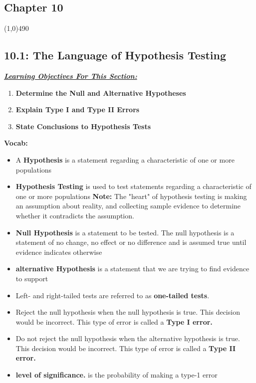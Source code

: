 \documentclass{report}
\begin{document}
    \pagebreak 
    \begin{center}
        \section*{Chapter 10}
    \end{center}
    \line(1,0){490}
    \bigbreak \noindent 
    \subsection*{10.1: The Language of Hypothesis Testing}
    \bigbreak \noindent 
    \textbf{\textit{\underline{Learning Objectives For This Section:}}}
    \begin{enumerate}
        \item \textbf{Determine the Null and Alternative Hypotheses}
        \item \textbf{Explain Type I and Type II Errors}
        \item \textbf{State Conclusions to Hypothesis Tests}
    \end{enumerate}
    \bigbreak \noindent 
    \textbf{Vocab:}
    \begin{itemize}
        \item A \textbf{Hypothesis} is a statement regarding a characteristic of one or more populations
        \item \textbf{Hypothesis Testing} is used to test statements regarding a characteristic of one or more populations
            \textbf{Note:} The "heart" of hypothesis testing is making an assumption about reality, and collecting sample evidence to determine whether it contradicts the assumption.
        \item \textbf{Null Hypothesis} is a statement to be tested. The null hypothesis is a statement of no change, no effect or no difference and is assumed true until evidence indicates otherwise
        \item \textbf{alternative Hypothesis} is a statement that we are trying to find evidence to support
        \item Left- and right-tailed tests are referred to as \textbf{one-tailed tests}. 
        \item Reject the null hypothesis when the null hypothesis is true. This decision would be incorrect. This type of error is called a \textbf{Type I error.}
        \item Do not reject the null hypothesis when the alternative hypothesis is true. This decision would be incorrect. This type of error is called a \textbf{Type II error.}
        \item \textbf{level of significance.} is the probability of making a type-1 error
    \end{itemize}
\end{document}
